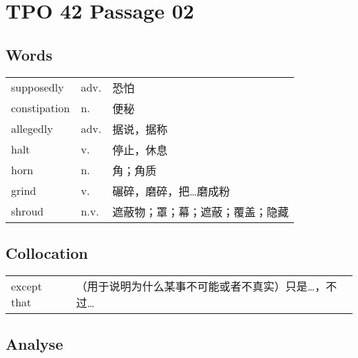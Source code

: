 \section{TPO 42 Passage 02}

\subsection{Words}

\begin{tabular}{lll}
    supposedly   & adv. & 恐怕               \\
    constipation & n.   & 便秘               \\
    allegedly    & adv. & 据说，据称            \\
    halt         & v.   & 停止，休息            \\
    horn         & n.   & 角；角质             \\
    grind        & v.   & 碾碎，磨碎，把…磨成粉      \\
    shroud       & n.v. & 遮蔽物；罩；幕；遮蔽；覆盖；隐藏 \\
\end{tabular}

\subsection{Collocation}

\begin{tabular}{ll}
    except that & （用于说明为什么某事不可能或者不真实）只是…，不过… \\
\end{tabular}

\subsection{Analyse}

